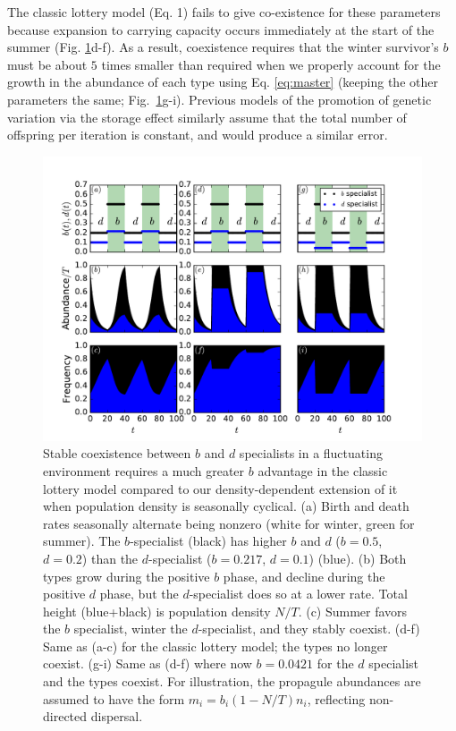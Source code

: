 \documentclass[11pt]{article}
\begin{document}
The classic lottery model (Eq. 1) fails to give co-existence for these parameters because expansion to carrying capacity occurs immediately at the start of the summer (Fig. \ref{fig:fluctuatingselection}d-f). As a result, coexistence requires that the winter survivor's $b$ must be about $5$ times smaller than required when we properly account for the growth in the abundance of each type using Eq. \eqref{eq:master} (keeping the other parameters the same; Fig.~\ref{fig:fluctuatingselection}g-i). Previous models of the promotion of genetic variation via the storage effect  \citep{ellner_1994} similarly assume that the total number of offspring per iteration is constant, and would produce a similar error. 

\begin{figure}
\centering
\includegraphics[scale=0.7]{fluctuatingselection.pdf}
\caption{\label{fig:fluctuatingselection} Stable coexistence between $b$ and $d$ specialists in a fluctuating environment requires a much greater $b$ advantage in the classic lottery model compared to our density-dependent extension of it when population density is seasonally cyclical. (a) Birth and death rates seasonally alternate being nonzero (white for winter, green for summer). The $b$-specialist (black) has higher $b$ and $d$ ($b=0.5$, $d=0.2$) than the $d$-specialist ($b=0.217$, $d=0.1$) (blue). (b) Both types grow during the positive $b$ phase, and decline during the positive $d$ phase, but the $d$-specialist does so at a lower rate. Total height (blue+black) is population density $N/T$. (c) Summer favors the $b$ specialist, winter the $d$-specialist, and they stably coexist. (d-f) Same as (a-c) for the classic lottery model; the types no longer coexist. (g-i) Same as (d-f) where now $b = 0.0421$ for the $d$ specialist and the types coexist. For illustration, the propagule abundances are assumed to have the form $m_i=b_i(1-N/T)n_i$, reflecting non-directed dispersal.} 
\end{figure}
\end{document}
